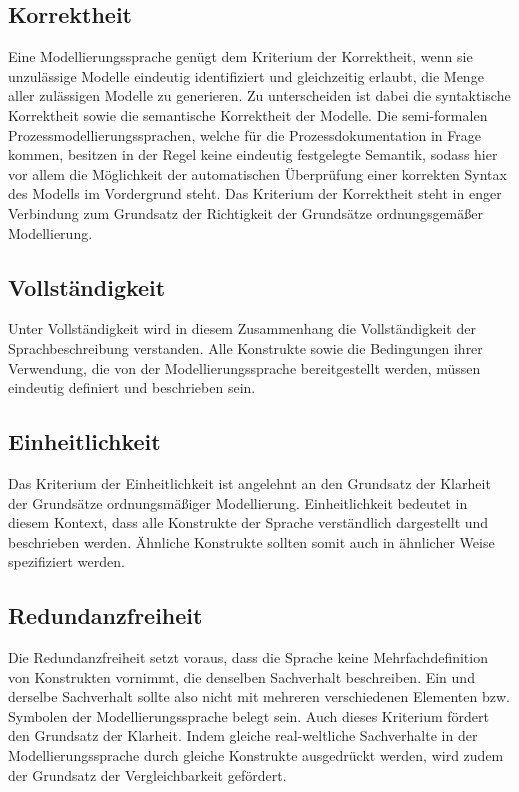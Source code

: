 \subsection{Korrektheit}
\label{ssc:Korrektheit}
Eine Modellierungssprache genügt dem Kriterium der Korrektheit, wenn sie unzulässige Modelle eindeutig identifiziert und gleichzeitig erlaubt, die Menge aller zulässigen Modelle zu generieren. Zu unterscheiden ist dabei die syntaktische Korrektheit sowie die semantische Korrektheit der Modelle. Die semi-formalen Prozessmodellierungssprachen, welche für die Prozessdokumentation in Frage kommen, besitzen in der Regel keine eindeutig festgelegte Semantik, sodass hier vor allem die Möglichkeit der automatischen Überprüfung einer korrekten Syntax des Modells im Vordergrund steht. Das Kriterium der Korrektheit steht in enger Verbindung zum Grundsatz der Richtigkeit der Grundsätze ordnungsgemäßer Modellierung.\cite{MT007}
\subsection{Vollständigkeit}
\label{ssc:Vollständigkeit}
Unter Vollständigkeit wird in diesem Zusammenhang die Vollständigkeit der Sprachbeschreibung verstanden. Alle Konstrukte sowie die Bedingungen ihrer Verwendung, die von der Modellierungssprache bereitgestellt werden, müssen eindeutig definiert und beschrieben sein.\cite{MT007}
\subsection{Einheitlichkeit}
\label{ssc:Einheitlichkeit}
Das Kriterium der Einheitlichkeit ist angelehnt an den Grundsatz der Klarheit der Grundsätze ordnungsmäßiger Modellierung. Einheitlichkeit bedeutet in diesem Kontext, dass alle Konstrukte der Sprache verständlich dargestellt und beschrieben werden. Ähnliche Konstrukte sollten somit auch in ähnlicher Weise spezifiziert werden.
\subsection{Redundanzfreiheit}
\label{ssc:Redundanzfreiheit}
Die Redundanzfreiheit setzt voraus, dass die Sprache keine Mehrfachdefinition von Konstrukten vornimmt, die denselben Sachverhalt beschreiben. Ein und derselbe Sachverhalt sollte also nicht mit mehreren verschiedenen Elementen bzw. Symbolen der Modellierungssprache belegt sein. Auch dieses Kriterium fördert den Grundsatz der Klarheit. Indem gleiche real-weltliche Sachverhalte in der Modellierungssprache durch gleiche Konstrukte ausgedrückt werden, wird zudem der Grundsatz der Vergleichbarkeit gefördert.
